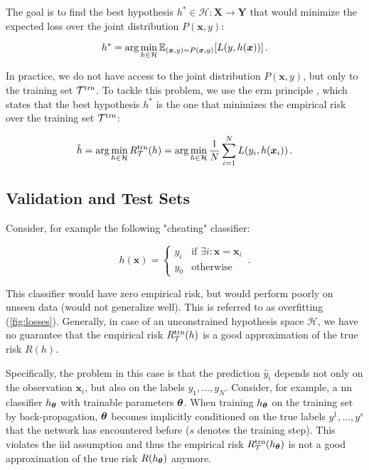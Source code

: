 The goal is to find the best hypothesis $h^* \in \mathcal{H}:
    \mathbf{X} \rightarrow \mathbf{Y}$ that would minimize the expected loss over the joint distribution $P(\bm{x}, y)$:

\begin{equation}
    h^* = \arg \min_{h \in \mathcal{H}} \mathbb{E}_{(\bm{x}, y) \sim P(\bm{x}, y)}[L(y, h(\bm{x}))]\,.
\end{equation}

In practice, we do not have access to the joint distribution $P(\bm{x}, y)$, but only to the training set $\mathcal{T}^\text{trn}$. To
tackle this problem, we use the \gls{erm} principle \cite{risk-minimization}, which states that the best hypothesis
$h^*$ is the one that minimizes the empirical risk over the training set $\mathcal{T}^\text{trn}$:

\begin{equation}
    \hat{h} = \arg \min_{h \in \mathcal{H}} R_\mathcal{T}^\text{trn}(h) = \arg \min_{h \in \mathcal{H}} \frac{1}{N} \sum_{i=1}^{N} L(y_i, h(\bm{x}_i))\,.
\end{equation}










\subsection{Validation and Test Sets}

Consider, for example the following "cheating" classifier:

\begin{equation}
    h(\bm{x}) = \begin{cases}
        y_i & \text{if } \exists i : \bm{x} = \bm{x}_i \\
        y_0 & \text{otherwise}
    \end{cases}\,.
\end{equation}


This classifier would have zero empirical risk, but would perform poorly on unseen data (would not generalize well).
This is referred to as overfitting (\autoref{fig:losses}). Generally, in case of an unconstrained
hypothesis space $\mathcal{H}$, we have no guarantee that the empirical risk $R_\mathcal{T}^\text{trn}(h)$ is a good approximation of the
true risk $R(h)$.


Specifically, the problem in this case is that the prediction $\hat{y}_i$ depends not only on the observation
$\bm{x}_i$, but also on the labels $y_1, \dots, y_N$. Consider, for example, a \gls{nn} classifier $h_{{\boldsymbol{\theta}}}$ with trainable
parameters ${\boldsymbol{\theta}}$. When training $h_{{\boldsymbol{\theta}}}$ on the training set by back-propagation, ${\boldsymbol{\theta}}$  becomes implicitly
conditioned on the true labels $y^1, \dots, y^s$ that the network has encountered before ($s$ denotes the training step).
This violates the \gls{iid} assumption and thus the empirical risk $R_\mathcal{T}^\text{trn}(h_{{\boldsymbol{\theta}}})$ is not a good approximation of
the true risk $R(h_{{\boldsymbol{\theta}}})$ anymore.


